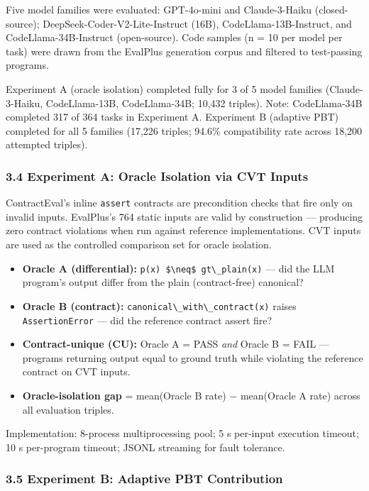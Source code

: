 Five model families were evaluated: GPT-4o-mini and Claude-3-Haiku (closed-source); DeepSeek-Coder-V2-Lite-Instruct (16B), CodeLlama-13B-Instruct, and CodeLlama-34B-Instruct (open-source). Code samples (n = 10 per model per task) were drawn from the EvalPlus generation corpus and filtered to test-passing programs.

Experiment A (oracle isolation) completed fully for 3 of 5 model families (Claude-3-Haiku, CodeLlama-13B, CodeLlama-34B; 10,432 triples). Note: CodeLlama-34B completed 317 of 364 tasks in Experiment A. Experiment B (adaptive PBT) completed for all 5 families (17,226 triples; 94.6\% compatibility rate across 18,200 attempted triples).

\subsubsection{3.4 Experiment A: Oracle Isolation via CVT Inputs}

ContractEval's inline \texttt{assert} contracts are precondition checks that fire only on invalid inputs. EvalPlus's 764 static inputs are valid by construction --- producing zero contract violations when run against reference implementations. CVT inputs are used as the controlled comparison set for oracle isolation.

\begin{itemize}
\item \textbf{Oracle A (differential):} \texttt{p(x) \$\textbackslash neq\$ gt\textbackslash \_plain(x)} --- did the LLM program's output differ from the plain (contract-free) canonical?
\item \textbf{Oracle B (contract):} \texttt{canonical\textbackslash \_with\textbackslash \_contract(x)} raises \texttt{AssertionError} --- did the reference contract assert fire?
\item \textbf{Contract-unique (CU):} Oracle A = PASS \textit{and} Oracle B = FAIL --- programs returning output equal to ground truth while violating the reference contract on CVT inputs.
\item \textbf{Oracle-isolation gap} = mean(Oracle B rate) $-$ mean(Oracle A rate) across all evaluation triples.
\end{itemize}

Implementation: 8-process multiprocessing pool; 5 s per-input execution timeout; 10 s per-program timeout; JSONL streaming for fault tolerance.

\subsubsection{3.5 Experiment B: Adaptive PBT Contribution}


